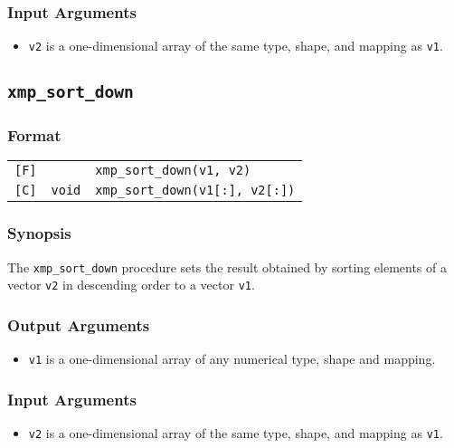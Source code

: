 \subsubsection*{Input Arguments}
\begin{itemize}
 \item {\tt v2} is a one-dimensional array of the same type, shape, and
       mapping as {\tt v1}.
\end{itemize}


\subsection{\tt xmp\_sort\_down}

\subsubsection*{Format}

\begin{tabular}{lll}

\verb![F]!&            & {\tt xmp\_sort\_down(v1, v2)}\\

\verb![C]!& {\tt void} & {\tt xmp\_sort\_down(v1[:], v2[:])}\\

\end{tabular}

\subsubsection*{Synopsis}

The {\tt xmp\_sort\_down} procedure sets the result obtained by
sorting elements of a vector {\tt v2} in descending order to a vector
{\tt v1}.

\subsubsection*{Output Arguments}
\begin{itemize}
 \item {\tt v1} is a one-dimensional array of any numerical type,
       shape and mapping.
\end{itemize}

\subsubsection*{Input Arguments}
\begin{itemize}
 \item {\tt v2} is a one-dimensional array of the same type, shape, and
       mapping as {\tt v1}.
\end{itemize}

